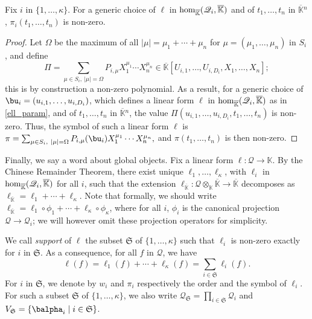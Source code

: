 \documentclass[12pt]{article}
\newcommand{\residueI}{\mathscr{Q}}
\def\dg{\kappa}
\def\K{\mathbb{K}}
\def\K {\ensuremath{\mathbb{K}}}
\def\Kbar {{\ensuremath{\overline{\mathbb{K}}}}}
\begin{document}
\begin{lemma}\label{lemma:symbol0}
  Fix $i$ in $\{1,\dots,\dg\}$. For a generic choice of $\ell$ in
  ${\rm hom}_\Kbar(\residueI_i,\Kbar)$ and of $t_1,\dots,t_n$ in $\Kbar{}^n$,
  $\pi_i(t_1,\dots,t_n)$ is non-zero.
\end{lemma}
\begin{proof}
  Let $\Omega$ be the maximum of all $|\mu|=\mu_1+\cdots+\mu_n$ for
  $\mu=(\mu_1,\dots,\mu_n)$ in $S_i$, and define 
	$$\Pi =\sum_{\mu \in S_i,\ |\mu|=\Omega}P_{i,\mu} X_1^{\mu_1}
  \cdots X_n^{\mu_n} \in
  \Kbar[U_{i,1},\dots,U_{i,D_i},X_1,\dots,X_n];$$ this is by
  construction a non-zero polynomial.  As a result, for a generic choice of
  $\bu_i=(u_{i,1},\dots,u_{i,D_i})$, which defines a linear form
  $\ell$ in ${\rm hom}_\Kbar(\residueI_i,\Kbar)$ as in \cref{ell_param},
  and of $t_1,\dots,t_n$ in $\Kbar{}^n$, the value
  $\Pi(u_{i,1},\dots,u_{i,D_i},t_1,\dots,t_n)$ is non-zero. Thus, the symbol of
  such a linear form $\ell$ is $\pi
  =\sum_{\mu \in S_i,\ |\mu|=\Omega}P_{i,\mu}(\bu_i) X_1^{\mu_1}
  \cdots X_n^{\mu_n},$ and $\pi(t_1,\dots,t_n)$ is then non-zero.
\end{proof}

Finally, we say a word about global objects.  Fix a linear form $\ell:
\residueI \to \K$. By the Chinese Remainder Theorem, there exist unique
$\ell_1,\dots,\ell_\dg$, with $\ell_i$ in ${\rm hom}_\Kbar(\residueI_i,\Kbar)$
for all $i$, such that the extension $\ell_\Kbar: \residueI\otimes_\K \Kbar
\to \Kbar$ decomposes as $\ell_\Kbar = \ell_1 + \cdots + \ell_\dg$.
Note that formally, we should write 
$\ell_\Kbar = \ell_1 \circ \phi_1 + \cdots + \ell_\dg \circ \phi_\dg$,
where for all $i$, $\phi_i$ is the canonical projection $\residueI \to \residueI_i$;
we will however omit these projection operators for simplicity.

We call {\em support} of $\ell$ the subset $\mathfrak{S}$ of
$\{1,\dots,\dg\}$ such that $\ell_i$ is non-zero exactly for $i$ in
$\mathfrak{S}$.  As a consequence, for all $f$ in $\residueI$, we have
\begin{equation}\label{eq:fui}
\ell(f) = \ell_1(f) + \cdots + \ell_\dg(f)
         =  \sum_{i \in \mathfrak{S}} \ell_i(f).
\end{equation}
For $i$ in $\mathfrak{S}$, we denote by $w_i$ and $\pi_i$ respectively
the order and the symbol of $\ell_i$. For such a subset $\mathfrak{S}$
of $\{1,\dots,\dg\}$, we also write $\residueI_\mathfrak{S}=\prod_{i
  \in \mathfrak{S}} \residueI_i$ and $V_\mathfrak{S}= \{\balpha_i \mid
i \in \mathfrak{S}\}$.
\end{document}
